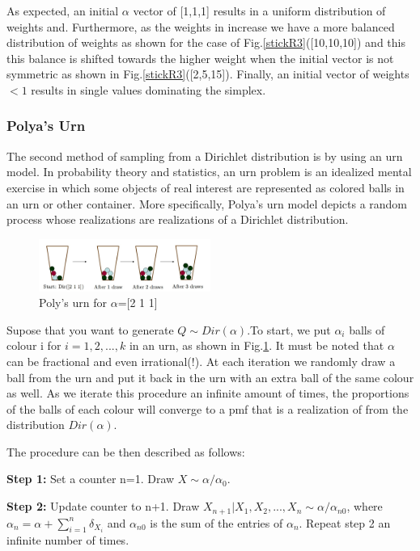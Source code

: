 \documentclass[twoside,hidelinks]{article}
\begin{document}
As expected, an initial $\alpha$ vector of [1,1,1] results in a uniform distribution of weights and. Furthermore, as the weights in increase we have a more balanced distribution of weights as shown for the case of Fig.\ref{stickR3}([10,10,10]) and this this balance is shifted towards the higher weight when the initial vector is not symmetric as shown in Fig.\ref{stickR3}([2,5,15]). Finally, an initial vector of weights $<1$ results in single values dominating the simplex.
\subsubsection{Polya's Urn}

The second method of sampling from a Dirichlet distribution is by using an urn model. In probability theory and statistics, an urn problem is an idealized mental exercise in which some objects of real interest are represented as colored balls in an urn or other container. More specifically, Polya's urn model depicts a random process whose realizations are realizations of a Dirichlet distribution.
\begin{figure}[!h]
    \centerline{\includegraphics[width=0.5\textwidth]{urn}}
	\caption{Poly's urn for $\alpha$=[2 1 1] }
	\label{polysurn}
\end{figure}
Supose that you want to generate $Q \sim Dir( \alpha ) $.To start, we put $\alpha_i$ balls of colour i for $i=1,2,...,k$ in an urn, as shown in Fig.\ref{polysurn}. It must be noted that $\alpha$ can be fractional and even irrational(!). At each iteration we randomly draw a ball from the urn and put it back in the urn with an extra ball of the same colour as well. As we iterate this procedure an infinite amount of times, the proportions of the balls of each colour will converge to a pmf that is a realization of from the distribution $Dir(\alpha)$.

The procedure can be then described as follows:
\begin{compactitem}

	\item \textbf{Step 1:} Set a counter n=1. Draw $ X \sim \alpha / \alpha_0 $. 
	\item \textbf{Step 2:} Update counter to n+1. Draw $ X_{n+1} | X_1, X_2, ..., X_n \sim \alpha / \alpha_{n0}$, where $\alpha_n = \alpha + \sum_{i=1}^n \delta_{X_i} $ and $ \alpha_{n0}$ is the sum of the entries of $\alpha_n$. Repeat step 2 an infinite number of times.
\end{compactitem}
\end{document}

